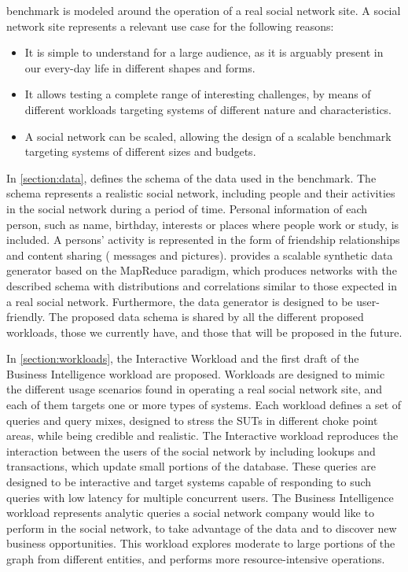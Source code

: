 \ldbcsnb benchmark is modeled around the operation of a real social network
site. A social network site represents a relevant use case for the following
reasons:

\begin{itemize}
    \item It is simple to understand for a large audience, as it is
        arguably present in our every-day life in different shapes and forms.
    \item It allows testing a complete range of interesting
        challenges, by means of different workloads targeting systems of
        different nature and characteristics.
    \item A social network can be scaled, allowing the design of a
        scalable benchmark targeting systems of different sizes and budgets.
\end{itemize}

In \autoref{section:data}, \ldbcsnb defines the schema of the data used in
the benchmark. The schema represents a realistic social network, including
people and their activities in the social network during a period of time.
Personal information of each person, such as name, birthday, interests
or places where people work or study, is included. A persons' activity is
represented in the form of friendship relationships and content sharing (\ie
messages and pictures). \ldbcsnb provides a scalable synthetic data generator
based on the MapReduce paradigm, which produces networks with the
described schema with distributions and correlations similar to those expected
in a real social network. Furthermore, the data generator is designed to be
user-friendly. The proposed data schema is shared by all the different proposed
workloads, those we currently have, and those that will be proposed in the future.

In \autoref{section:workloads}, the Interactive Workload and the first draft of
the Business Intelligence workload are proposed. Workloads are designed to mimic
the different usage scenarios found in operating a real social network site, and
each of them targets one or more types of systems.  Each workload defines a set
of queries and query mixes, designed to stress the SUTs in different choke point
areas, while being credible and realistic. The Interactive workload reproduces the
interaction between the users of the social network by including lookups and
transactions, which update small portions of the database. These queries are
designed to be interactive and target systems capable of responding to such queries
with low latency for multiple concurrent users. The Business Intelligence workload
represents analytic queries a social network company would
like to perform in the social network, to take advantage of the data and to
discover new business opportunities. This workload explores moderate to large
portions of the graph from different entities, and performs more resource-intensive
operations.

